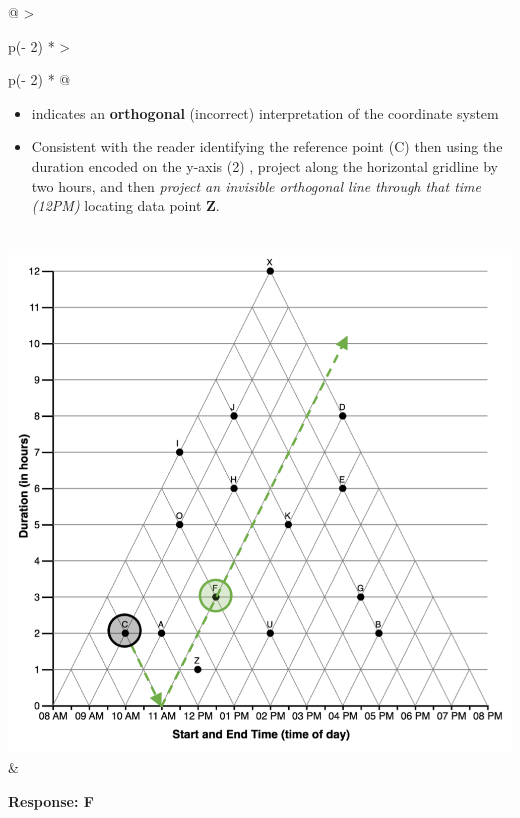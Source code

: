 \documentclass[
  letterpaper,
  DIV=11,
  numbers=noendperiod]{scrreprt}
\providecommand{\tightlist}{%
  \setlength{\itemsep}{0pt}\setlength{\parskip}{0pt}}\usepackage{longtable,booktabs,array}
\begin{document}
\begin{longtable}[]{@{}
  >{\raggedright\arraybackslash}p{(\columnwidth - 2\tabcolsep) * }
  >{\raggedright\arraybackslash}p{(\columnwidth - 2\tabcolsep) * }@{}}
\begin{minipage}[t]{\linewidth}
\begin{itemize}
\tightlist
\item
  indicates an \textbf{orthogonal} (incorrect) interpretation of the
  coordinate system
\item
  Consistent with the reader identifying the reference point (C) then
  using the duration encoded on the y-axis (2) , project along the
  horizontal gridline by two hours, and then \emph{project an invisible
  orthogonal line through that time (12PM)} locating data point
  \textbf{Z}.
\end{itemize}
\end{minipage} \\
\includegraphics{analysis/SGC3A/static/interpretations/Q3_111_F.png} &
\begin{minipage}[t]{\linewidth}\raggedright
\textbf{Response: F}


\end{minipage}
\end{longtable}
\end{document}
